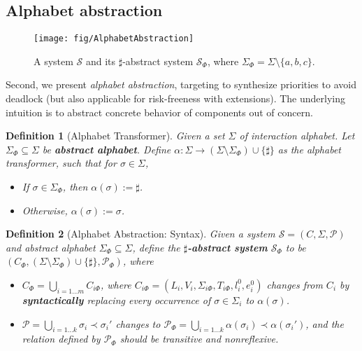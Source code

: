 \documentclass[10pt, a4paper, onecolumn, conference, compsocconf]{IEEEtran}
\newcommand{\sys}{\mathcal{S}}
\newcommand{\pri}{\mathcal{P}}
\newcommand{\initloc}[1]{l^0_{#1}}
\newcommand{\initeval}[1]{e^0_{#1}}
\newtheorem{defi}{Definition}
\begin{document}
\subsection{Alphabet abstraction\label{subsec.algo.prioritysyn.alphabet}}

\begin{figure}
\centering
 \texttt{[image: fig/AlphabetAbstraction]}
  \caption{A system $\mathcal{S}$ and its $\sharp$-abstract system $\sys_{\Phi}$, where $\Sigma_{\Phi} = \Sigma \setminus \{a,b,c\}$.}
 \label{fig:vissbip.alphabet.abstraction}
\end{figure}


Second, we present \emph{alphabet abstraction}, targeting to synthesize priorities to avoid deadlock
(but also applicable for risk-freeness with extensions). The underlying intuition is to abstract concrete behavior of
components out of concern.

\begin{defi}[Alphabet Transformer]
Given a set $\Sigma$ of interaction alphabet. Let $\Sigma_{\Phi} \subseteq \Sigma$ be \textbf{abstract alphabet}.
Define $\alpha: \Sigma \rightarrow (\Sigma\setminus\Sigma_{\Phi})\cup\{\sharp\}$ as the alphabet transformer, such that
for $\sigma \in \Sigma$,
\begin{itemize}
    \item If $\sigma \in \Sigma_{\Phi}$, then $\alpha(\sigma) := \sharp$.
    \item Otherwise, $\alpha(\sigma) := \sigma$.
\end{itemize}
\end{defi}

\begin{defi}[Alphabet Abstraction: Syntax]
Given a system $\sys=(C,\Sigma,\pri)$ and abstract alphabet $\Sigma_{\Phi}\subseteq \Sigma$, define the \textbf{$\sharp$-abstract system} $\sys_{\Phi}$  to be $(C_{\Phi},(\Sigma\setminus\Sigma_{\Phi})\cup\{\sharp\}, \pri_{\Phi})$, where
\begin{itemize}
    \item $C_{\Phi} = \bigcup_{i=1\ldots m} C_{i\Phi}$, where $C_{i\Phi}= (L_i, V_i, \Sigma_{i\Phi},  T_{i\Phi}, \initloc{i}, \initeval{i})$ changes from $C_{i}$ by \textbf{syntactically} replacing every occurrence of $\sigma \in \Sigma_i$ to $\alpha(\sigma)$.
    \item $\pri= \bigcup_{i=1\ldots k} \sigma_i\prec\sigma_i'$ changes to $\pri_{\Phi} = \bigcup_{i=1\ldots k} \alpha(\sigma_i)\prec\alpha(\sigma_i')$, and the relation defined by $\pri_{\Phi}$ should be transitive and nonreflexive.
\end{itemize}
\end{defi}
\end{document}
